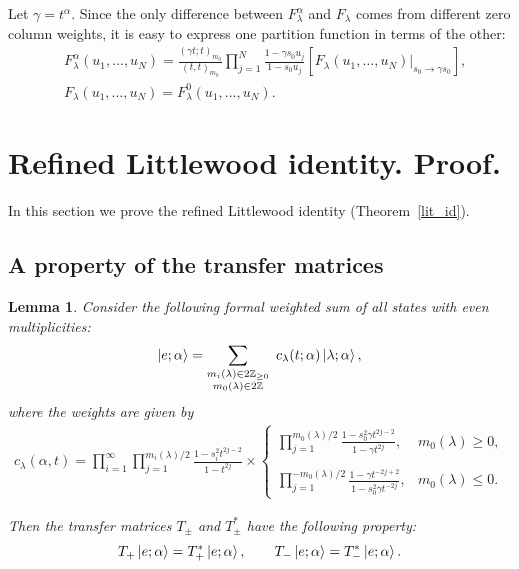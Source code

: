 \documentclass[11pt]{article}
\newtheorem{lemma}[theo]{Lemma}
\theoremstyle{definition}
\newcommand{\ket}[1]{\left|#1\right\rangle}
\begin{document}
Let $\gamma = t^{\alpha}$. Since the only difference between $F^{\alpha}_\lambda$ and $F_\lambda$ comes from different zero column weights, it is easy to express one partition function in terms of the other: 
\begin{equation}
\label{F_alpha}
\begin{split}
&F^{\alpha}_\lambda(u_1, \dots, u_N) = \frac{(\gamma t; t)_{m_0}}{( t, t)_{m_0}} \prod_{j=1}^{N} \frac{1 - \gamma s_0 u_j}{1 - s_0 u_j}
\left[ F_{\lambda}(u_1, \dots, u_N)
\Big\vert_{\text{$s_0\to \gamma s_0$}}\right],\\
&F_{\lambda}(u_1, \dots, u_N) = F^{0}_{\lambda}(u_1, \dots, u_N).
\end{split}
\end{equation}

\section{Refined Littlewood identity. Proof.}
\label{sec:sHL_proof}

In this section we prove the refined Littlewood identity (Theorem~\ref{lit_id}).
\subsection{A property of the transfer matrices}
\begin{lemma} \label{lem_T_op}
	Consider the following formal weighted sum of all states with even multiplicities:
	\begin{align*}
	\label{e-vect}
	\ket{\rm e;\alpha}
	=
	\sum_{\substack{
			m_{i}(\lambda) \in 2 \mathbb{Z}_{\geq 0} \\ m_0(\lambda) \in 2 \mathbb{Z} 
	}}
	\
	c_{\lambda}(t; \alpha)
	\ket{\lambda;\alpha},
	\end{align*}
	where the weights are given by
	\begin{align*}
	c_{\lambda}(\alpha,t) 
	= 
	\prod_{i = 1}^{\infty} \prod_{j = 1}^{m_{i}(\lambda) / 2} \frac{1 - s_{i}^2 t^{2j - 2}}{1 - t^{2j}}
	\times
	\left\{
	\begin{array}{cl}
	\displaystyle{
		\prod_{j = 1}^{m_{0}(\lambda) / 2} \frac{1 - s_{0}^2 \gamma t^{2j - 2}}{1 - \gamma t^{2j}}
	},
	&
	m_0(\lambda) \geq 0,
	\\ \\ 
	\displaystyle{
		\prod_{j=1}^{-m_0(\lambda)/2}
		\frac{1 - \gamma t^{-2j+2}}{1 - s_{0}^2 \gamma t^{-2j}}
	},
	&
	m_0(\lambda) \leq 0.
	\end{array}
	\right.
	\end{align*}
	
	Then the transfer matrices $T_{\pm}$ and $T^{*}_{\pm}$ have the following property:
	\begin{equation} \label{eq: lem_T_op}
	T_{+}\ket{\rm e;\alpha} = T^{*}_{+}\ket{\rm e;\alpha}, \quad\quad T_{-}\ket{\rm e;\alpha} = T^{*}_{-}\ket{\rm e;\alpha}.
	\end{equation}
\end{lemma}
\end{document}
